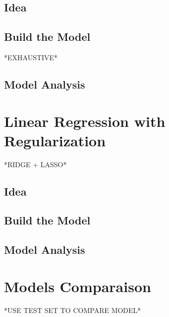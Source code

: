 \documentclass[]{report}
\begin{document}
\subsection{Idea}

\subsection{Build the Model}
*EXHAUSTIVE*
\subsection{Model Analysis}

\section{Linear Regression with Regularization}

*RIDGE + LASSO*
\subsection{Idea}

\subsection{Build the Model}

\subsection{Model Analysis}



\section{Models Comparaison}
*USE TEST SET TO COMPARE MODEL*
\end{document}
